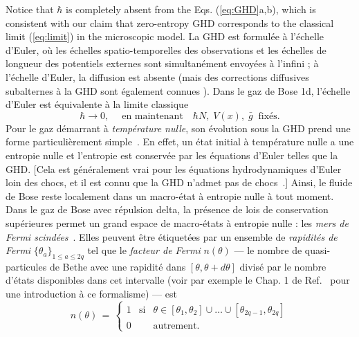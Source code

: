 \documentclass[twocolumn,amsfonts,showpacs,superscriptaddress]{revtex4-1}
\newcommand{\trad}[1]{\textcolor{myblue}{#1}}
\begin{document}
Notice that $\hbar$ is completely absent from the Eqs. (\ref{eq:GHD}a,b), which is consistent with our claim that zero-entropy GHD corresponds to the classical limit (\ref{eq:limit}) in the microscopic model.
\trad{La GHD est formulée à l'échelle d'Euler, où les échelles spatio-temporelles des observations et les échelles de longueur des potentiels externes sont simultanément envoyées à l'infini ; à l'échelle d'Euler, la diffusion est absente (mais des corrections diffusives subalternes à la GHD sont également connues \cite{de2018hydrodynamic,10.21468/SciPostPhys.6.4.049,gopalakrishnan2018hydrodynamics}). Dans le gaz de Bose 1d, l'échelle d'Euler est équivalente à la limite classique~\cite{brun2017one,brun2018inhomogeneous,ruggiero2019conformal}
\begin{equation*}
	 \hbar \rightarrow 0 , \quad \; \text{en maintenant} \quad \hbar N, \; V(x), \; \bar{g} \; \; \text{fixés}.
\end{equation*}
Pour le gaz démarrant à {\it température nulle}, son évolution sous la GHD prend une forme particulièrement simple~\cite{doyon2017large}. En effet, un état initial à température nulle a une entropie nulle et l'entropie est conservée par les équations d'Euler telles que la GHD. [Cela est généralement vrai pour les équations hydrodynamiques d'Euler loin des chocs, et il est connu que la GHD n'admet pas de chocs~\cite{el2005kinetic,doyon2017large,bulchandani2017classical}.] Ainsi, le fluide de Bose reste localement dans un macro-état à entropie nulle à tout moment. Dans le gaz de Bose avec répulsion delta, la présence de lois de conservation supérieures permet un grand espace de macro-états à entropie nulle : les {\it mers de Fermi scindées}~\cite{fokkema2014split,eliens2016general,vlijm2016correlations,eliens2017quantum}. Elles peuvent être étiquetées par un ensemble de {\it rapidités de Fermi} $\{\theta_a\}_{1\leq a\leq 2q}$ tel que le {\it facteur de Fermi} $n(\theta)$ — le nombre de quasi-particules de Bethe avec une rapidité dans $[\theta, \theta + d \theta]$ divisé par le nombre d'états disponibles dans cet intervalle (voir par exemple le Chap. 1 de Ref.~\cite{korepin1997quantum} pour une introduction à ce formalisme) — est
\begin{equation*}
	n(\theta) \, = \, \left\{ 
	    \begin{array}{rcl} 
		    1 & \text{si} & \theta \in [\theta_1 ,\theta_2] \cup \dots \cup [\theta_{2q-1},\theta_{2q}] \\
		    0 & & \text{autrement} .
		\end{array}

\end{equation*}}
\end{document}
